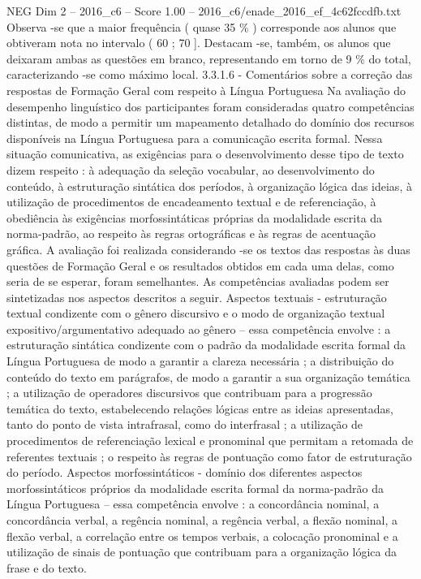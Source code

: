 \begin{textsample}{NEG Dim 2 – 2016\_c6 – Score 1.00 – 2016\_c6/enade\_2016\_ef\_4c62fccdfb.txt}
Observa -se que a maior frequência ( quase 35 \% ) corresponde aos alunos que obtiveram nota no intervalo ( 60 ; 70 ].
Destacam -se, também, os alunos que deixaram ambas as questões em branco, representando em torno de 9 \% do total, caracterizando -se como máximo local. 3.3.1.6 - Comentários sobre a correção das respostas de Formação Geral com respeito à Língua Portuguesa Na avaliação do desempenho linguístico dos participantes foram consideradas quatro competências distintas, de modo a permitir um mapeamento detalhado do domínio dos recursos disponíveis na Língua Portuguesa para a comunicação escrita formal.
Nessa situação comunicativa, as exigências para o desenvolvimento desse tipo de texto dizem respeito : à adequação da seleção vocabular, ao desenvolvimento do conteúdo, à estruturação sintática dos períodos, à organização lógica das ideias, à utilização de procedimentos de encadeamento textual e de referenciação, à obediência às exigências morfossintáticas próprias da modalidade escrita da norma-padrão, ao respeito às regras ortográficas e às regras de acentuação gráfica.
A avaliação foi realizada considerando -se os textos das respostas às duas questões de Formação Geral e os resultados obtidos em cada uma delas, como seria de se esperar, foram semelhantes.
As competências avaliadas podem ser sintetizadas nos aspectos descritos a seguir.
Aspectos textuais - estruturação textual condizente com o gênero discursivo e o modo de organização textual expositivo/argumentativo adequado ao gênero – essa competência envolve : a estruturação sintática condizente com o padrão da modalidade escrita formal da Língua Portuguesa de modo a garantir a clareza necessária ; a distribuição do conteúdo do texto em parágrafos, de modo a garantir a sua organização temática ; a utilização de operadores discursivos que contribuam para a progressão temática do texto, estabelecendo relações lógicas entre as ideias apresentadas, tanto do ponto de vista intrafrasal, como do interfrasal ; a utilização de procedimentos de referenciação lexical e pronominal que permitam a retomada de referentes textuais ; o respeito às regras de pontuação como fator de estruturação do período.
Aspectos morfossintáticos - domínio dos diferentes aspectos morfossintáticos próprios da modalidade escrita formal da norma-padrão da Língua Portuguesa – essa competência envolve : a concordância nominal, a concordância verbal, a regência nominal, a regência verbal, a flexão nominal, a flexão verbal, a correlação entre os tempos verbais, a colocação pronominal e a utilização de sinais de pontuação que contribuam para a organização lógica da frase e do texto.

\end{textsample}
